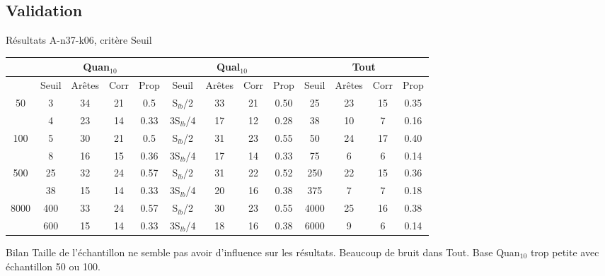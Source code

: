 \documentclass{beamer}
\begin{document}
\subsection{Validation}
\begin{frame}{Résultats A-n37-k06, critère Seuil}

\begin{table}[H]

\begin{tabular}{|@{}c@{}|@{}c@{}|@{}c@{}|@{}c@{}|@{}c@{}||@{}c@{}|@{}c@{}|@{}c@{}|@{}c@{}||@{}c@{}|@{}c@{}|@{}c@{}|@{}c@{}|}

\hline
 & \multicolumn{4}{c|}{Quan$_{10}$} & \multicolumn{4}{c|}{Qual$_{10}$} & \multicolumn{4}{c|}{Tout} \\
 \hline
 & Seuil & Arêtes & Corr & Prop & Seuil & Arêtes & Corr & Prop & Seuil & Arêtes & Corr & Prop \\
 \hline
 50 & 3 & 34 & 21 & 0.5 & S$_{lb}$/2 & 33 & 21 & 0.50 & 25 & 23 & 15 & 0.35 \\
 \cline{2-13} 
    & 4 & 23 & 14 & 0.33 & 3S$_{lb}$/4 & 17 & 12 & 0.28 & 38 & 10 & 7 & 0.16 \\
  \hline
   100 & 5 & 30 & 21 & 0.5 & S$_{lb}$/2 & 31 & 23 & 0.55 & 50 & 24 & 17 & 0.40 \\
 \cline{2-13} 
    & 8 & 16 & 15 & 0.36 & 3S$_{lb}$/4 & 17 & 14 & 0.33 & 75 & 6 & 6 & 0.14 \\
  \hline
   500 & 25 & 32 & 24 & 0.57 & S$_{lb}$/2 & 31 & 22 & 0.52 & 250 & 22 & 15 & 0.36 \\
 \cline{2-13} 
    & 38 & 15 & 14 & 0.33 & 3S$_{lb}$/4 & 20 & 16 & 0.38 & 375 & 7 & 7 & 0.18 \\
  \hline
   8000 & 400 & 33 & 24 & 0.57 & S$_{lb}$/2 & 30 & 23 & 0.55 & 4000 & 25 & 16 & 0.38 \\
 \cline{2-13} 
    & 600 & 15 & 14 & 0.33 & 3S$_{lb}$/4 & 18 & 16 & 0.38 & 6000 & 9 & 6 & 0.14 \\
  \hline

\end{tabular}

\begin{block}{Bilan}
Taille de l'échantillon ne semble pas avoir d'influence sur les résultats.
Beaucoup de bruit dans Tout.
Base Quan$_{10}$ trop petite avec échantillon 50 ou 100.

\end{block}
\end{table}
\end{frame}
\end{document}
